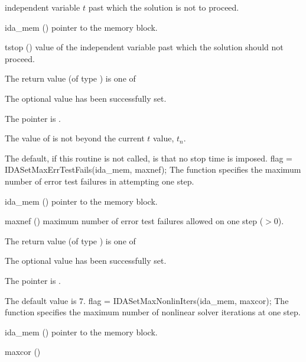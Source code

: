 {{  independent variable $t$ past which the solution is not to proceed.
}
{
  \begin{args}
  \item[ida\_mem] ()
    pointer to the {\idas} memory block.
  \item[tstop] ()
    value of the independent variable past which the solution should
    not proceed.
  \end{args}
}
{
  The return value  (of type ) is one of
  \begin{args}
  \item[\Id{IDA\_SUCCESS}] 
    The optional value has been successfully set.
  \item[\Id{IDA\_MEM\_NULL}] 
    The  pointer is .
  \item[\Id{IDA\_ILL\_INPUT}] 
    The value of  is not beyond the current $t$ value, $t_n$.
  \end{args}
}
{
  The default, if this routine is not called, is that no stop time is imposed.
}
{
flag = IDASetMaxErrTestFails(ida\_mem, maxnef);
}
{
  The function  specifies the
  maximum number of error test failures in attempting one step.
}
{
  \begin{args}
  \item[ida\_mem] ()
    pointer to the {\idas} memory block.
  \item[maxnef] ()
    maximum number of error test failures allowed on one step ($>0$).
  \end{args}
}
{
  The return value  (of type ) is one of
  \begin{args}
  \item[\Id{IDA\_SUCCESS}] 
    The optional value has been successfully set.
  \item[\Id{IDA\_MEM\_NULL}]
    The  pointer is .
  \end{args}
}
{
  The default value is $7$.
}
{
flag = IDASetMaxNonlinIters(ida\_mem, maxcor);
}
{
  The function  specifies the maximum
  number of nonlinear solver iterations at one step.
}
{
  \begin{args}
  \item[ida\_mem] ()
    pointer to the {\idas} memory block.
  \item[maxcor] ()

\end{args}}}
